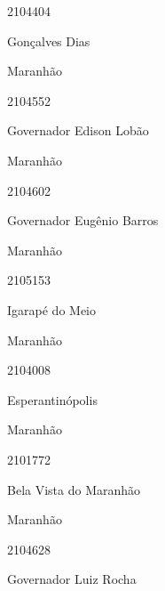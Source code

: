 \documentclass[
  letterpaper,
]{report}
\begin{document}
2104404

\n      

Gonçalves Dias

\n    

\n    

\n      

Maranhão

\n      

2104552

\n      

Governador Edison Lobão

\n    

\n    

\n      

Maranhão

\n      

2104602

\n      

Governador Eugênio Barros

\n    

\n    

\n      

Maranhão

\n      

2105153

\n      

Igarapé do Meio

\n    

\n    

\n      

Maranhão

\n      

2104008

\n      

Esperantinópolis

\n    

\n    

\n      

Maranhão

\n      

2101772

\n      

Bela Vista do Maranhão

\n    

\n    

\n      

Maranhão

\n      

2104628

\n      

Governador Luiz Rocha

\n    
\end{document}
